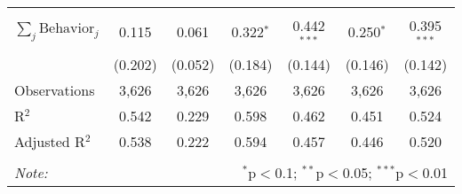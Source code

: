 \begin{tabular}{@{\extracolsep{1pt}}lcccccc}
\hline \\[-1.8ex] 
$\sum_j \mathrm{Behavior}_j$ & 0.115 & 0.061 & 0.322$^{*}$ & 0.442$^{***}$ & 0.250$^{*}$ & 0.395$^{***}$ \\ 
 & (0.202) & (0.052) & (0.184) & (0.144) & (0.146) & (0.142) \\ 
Observations & 3,626 & 3,626 & 3,626 & 3,626 & 3,626 & 3,626 \\ 
R$^{2}$ & 0.542 & 0.229 & 0.598 & 0.462 & 0.451 & 0.524 \\ 
Adjusted R$^{2}$ & 0.538 & 0.222 & 0.594 & 0.457 & 0.446 & 0.520 \\ 
\hline 
\hline \\[-1.8ex] 
\textit{Note:}  & \multicolumn{6}{r}{$^{*}$p$<$0.1; $^{**}$p$<$0.05; $^{***}$p$<$0.01} \\ 
\end{tabular} 